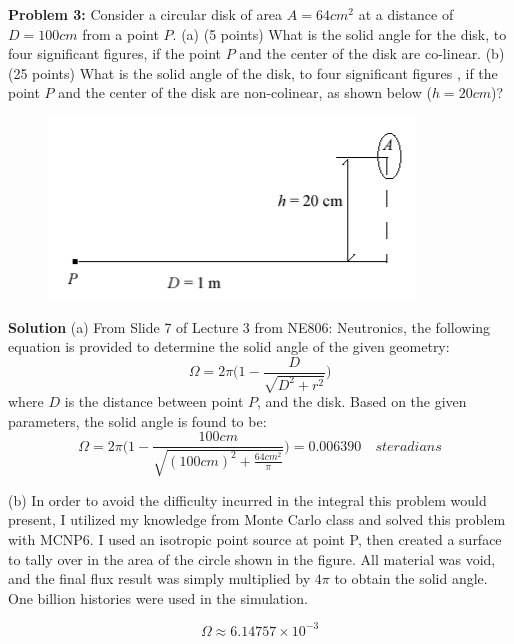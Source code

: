 \documentclass{amsart}
\theoremstyle{definition}
\begin{document}
\newpage
\textbf{Problem 3:} Consider a circular disk of area $A=64 cm^2$ at a distance of $D=100 cm$ from a point $P$. \newline
(a) (5 points) What is the solid angle for the disk, to four significant figures, if the point $P$ and the center of the disk are co-linear. \newline
(b) (25 points) What is the solid angle of the disk, to four significant figures , if the point $P$ and the center of the disk are non-colinear, as shown below ($h=20 cm$)? \newline
\begin{figure}[h!]
                \includegraphics[width=0.6\linewidth]{HW1_Problem3.png}
\end{figure}
\bigbreak
\textbf{Solution}
\bigbreak
(a) From Slide 7 of Lecture 3 from NE806: Neutronics, the following equation is provided to determine the solid angle of the given geometry:
\bigbreak
\begin{equation*}
   \Omega  = 2\pi\bigg(1-\frac{D}{\sqrt{D^2+r^2}}\bigg)
\end{equation*}
\bigbreak
where $D$ is the distance between point $P$, and the disk. Based on the given parameters, the solid angle is found to be:
\bigbreak
\begin{equation*}
   \Omega  = 2\pi\bigg(1-\frac{100 cm}{\sqrt{(100 cm)^2+\frac{64cm^2}{\pi}}}\bigg) = \boxed{0.006390 \quad steradians}
\end{equation*}
\bigbreak


(b)
In order to avoid the difficulty incurred in the integral this problem would present, I utilized my knowledge from Monte Carlo class and solved this problem with MCNP6.
I used an isotropic point source at point P, then created a surface to tally over in the area of the circle shown in the figure.
All material was void, and the final flux result was simply multiplied by $4 \pi$ to obtain the solid angle.
One billion histories were used in the simulation.

$$ \boxed{\Omega \approx 6.14757 \times 10^{-3}}  $$
 
\end{document}
